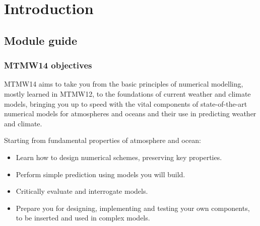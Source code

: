 \documentclass[11pt,fleqn]{book} %
\begin{document}
	
	\pagestyle{empty} %
	
	\renewcommand\contentsname{Table of Contents}
	\renewcommand{\bibname}{Bibliography}
	\tableofcontents%
	
	
	\pagestyle{fancy} %
	
	
\chapter{Introduction}
	
	\section{Module guide}
	\subsection{MTMW14 objectives}
	MTMW14 aims to take you from the basic principles of numerical modelling, mostly learned in MTMW12, to the foundations of current weather and climate models, bringing you up to speed with the vital components of state-of-the-art numerical models for atmospheres and oceans and their use in predicting weather and climate.
	
	Starting from fundamental properties of atmosphere and ocean:
\begin{itemize}
\item	Learn how to design numerical schemes, preserving key properties.
\item	Perform simple prediction using models you will build.
\item	Critically evaluate and interrogate models.
\item	Prepare you for designing, implementing and testing your own components, to be inserted and used in complex models.
\end{itemize}
	
\end{document}
